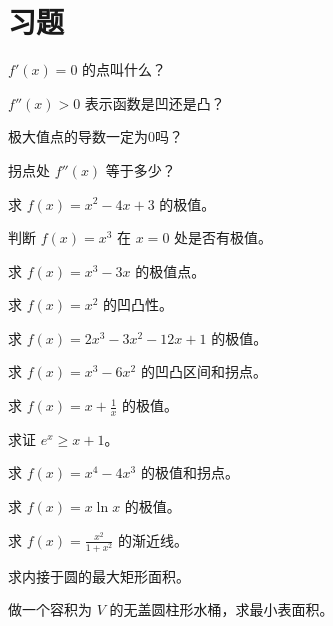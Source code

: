 \section{习题}
\begin{exercise}[0] \(f'(x)=0\) 的点叫什么？\end{exercise}
\begin{exercise}[0] \(f''(x)>0\) 表示函数是凹还是凸？\end{exercise}
\begin{exercise}[0] 极大值点的导数一定为0吗？\end{exercise}
\begin{exercise}[0] 拐点处 \(f''(x)\) 等于多少？\end{exercise}
\begin{exercise}[1] 求 \(f(x)=x^2-4x+3\) 的极值。\end{exercise}
\begin{exercise}[1] 判断 \(f(x)=x^3\) 在 \(x=0\) 处是否有极值。\end{exercise}
\begin{exercise}[1] 求 \(f(x)=x^3-3x\) 的极值点。\end{exercise}
\begin{exercise}[1] 求 \(f(x)=x^2\) 的凹凸性。\end{exercise}
\begin{exercise}[2] 求 \(f(x)=2x^3-3x^2-12x+1\) 的极值。\end{exercise}
\begin{exercise}[2] 求 \(f(x)=x^3-6x^2\) 的凹凸区间和拐点。\end{exercise}
\begin{exercise}[2] 求 \(f(x)=x+\frac{1}{x}\) 的极值。\end{exercise}
\begin{exercise}[2] 求证 \(e^x \ge x+1\)。\end{exercise}
\begin{exercise}[3] 求 \(f(x)=x^4-4x^3\) 的极值和拐点。\end{exercise}
\begin{exercise}[3] 求 \(f(x)=x\ln x\) 的极值。\end{exercise}
\begin{exercise}[3] 求 \(f(x)=\frac{x^2}{1+x^2}\) 的渐近线。\end{exercise}
\begin{exercise}[3] 求内接于圆的最大矩形面积。\end{exercise}
\begin{exercise}[3] 做一个容积为 \(V\) 的无盖圆柱形水桶，求最小表面积。\end{exercise}
